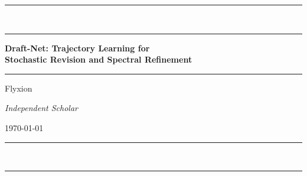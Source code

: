 \documentclass[12pt,a4paper]{article}
\theoremstyle{draftthm}
\begin{document}
\begin{titlepage}
\centering
\vspace*{1.8cm}

{\color{draftblue}\rule{\linewidth}{1.4pt}}\\[0.4em]
{\color{draftblue}\rule{\linewidth}{0.4pt}}

\vspace{1.0cm}
{\fontsize{22}{28}\selectfont\bfseries\color{draftblue}
Draft-Net: Trajectory Learning for\\[0.25em]
Stochastic Revision and Spectral Refinement}

\vspace{0.9cm}
{\color{draftblue}\rule{0.5\linewidth}{0.4pt}}

\vspace{0.8cm}
{\large Flyxion}

\vspace{0.4cm}
{\normalsize\color{draftgray}\itshape Independent Scholar}

\vspace{0.6cm}
{\small\color{draftgray} \today}

\vspace{1.2cm}
{\color{draftblue}\rule{\linewidth}{0.4pt}}\\[0.2em]
{\color{draftblue}\rule{\linewidth}{1.4pt}}


\end{titlepage}
\end{document}
